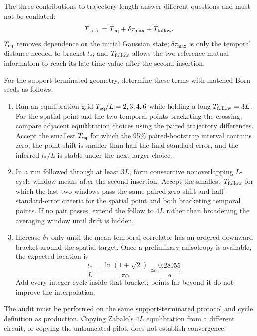 \documentclass[10pt]{article}
\begin{document}
The three contributions to trajectory length answer different questions and
must not be conflated:
\begin{equation}
T_{\rm total}=T_{\rm eq}+\delta\tau_{\max}+T_{\rm follow}.
\label{eq:cycle-budget}
\end{equation}
$T_{\rm eq}$ removes dependence on the initial Gaussian state;
$\delta\tau_{\max}$ is only the temporal distance needed to bracket $t_*$; and
$T_{\rm follow}$ allows the two-reference mutual information to reach its
late-time value after the second insertion.

For the support-terminated geometry, determine these terms with matched Born
seeds as follows.
\begin{enumerate}
\item Run an equilibration grid $T_{\rm eq}/L=2,3,4,6$ while holding a long
      $T_{\rm follow}=3L$.  For the spatial point and the two temporal points
      bracketing the crossing, compare adjacent equilibration choices using the
      paired trajectory differences.  Accept the smallest $T_{\rm eq}$ for
      which the 95\% paired-bootstrap interval contains zero, the point shift is
      smaller than half the final standard error, and the inferred $t_*/L$ is
      stable under the next larger choice.
\item In a run followed through at least $3L$, form consecutive nonoverlapping
      $L$-cycle window means after the second insertion.  Accept the smallest
      $T_{\rm follow}$ for which the last two windows pass the same paired
      zero-shift and half-standard-error criteria for the spatial point and both
      bracketing temporal points.  If no pair passes, extend the follow to $4L$
      rather than broadening the averaging window until drift is hidden.
\item Increase $\delta\tau$ only until the mean temporal correlator has an
      ordered downward bracket around the spatial target.  Once a preliminary
      anisotropy is available, the expected location is
      \begin{equation}
      \frac{t_*}{L}=\frac{\ln(1+\sqrt2)}{\pi\alpha}
      \simeq\frac{0.28055}{\alpha}.
      \end{equation}
      Add every integer cycle inside that bracket; points far beyond it do not
      improve the interpolation.
\end{enumerate}
The audit must be performed on the same support-terminated protocol and cycle
definition as production.  Copying Zabalo's $4L$ equilibration from a different
circuit, or copying the untruncated pilot, does not establish convergence.
\end{document}
